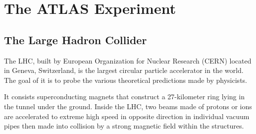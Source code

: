 \documentclass[UTF8,12pt]{ctexart}
\numberwithin{equation}{section}
\begin{document}
%
%
%



\newpage
{}
\section{The ATLAS Experiment}
\label{sec:3}

\subsection{The Large Hadron Collider}
\label{sec:3.1}

The LHC, built by European Organization for Nuclear Research (CERN) located in Geneva, Switzerland, is the largest circular particle accelerator in the world. The goal of it is to probe the various theoretical predictions made by physicists.
  
It consists superconducting magnets that construct a 27-kilometer ring lying in the tunnel under the ground. Inside the LHC, two beams made of protons or ions are accelerated to extreme high speed in opposite direction in individual vacuum pipes then made into collision by a strong magnetic field within the structures.
\end{document}

